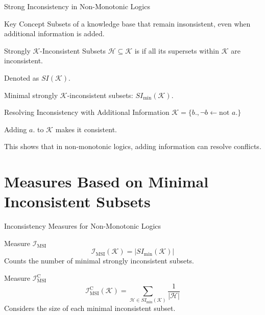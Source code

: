 \begin{frame}{Strong Inconsistency in Non-Monotonic Logics}
    \begin{block}{Key Concept}
        Subsets of a knowledge base that remain insonsistent, even when additional information is added.
    \end{block}

    \begin{block}{Strongly $\mathcal{K}$-Inconsistent Subsets}
        $\mathcal{H} \subseteq \mathcal{K}$ is  if all its supersets within $\mathcal{K}$ are inconsistent.

        Denoted as $SI(\mathcal{K})$.

        Minimal strongly $\mathcal{K}$-inconsistent subsets: $SI_{\min}(\mathcal{K})$.
    \end{block}

    \begin{exampleblock}{Resolving Inconsistency with Additional Information}
        $\mathcal{K} = \{b., \neg b \leftarrow \text{not } a.\}$

        Adding $a.$ to $\mathcal{K}$ makes it consistent.

        This shows that in non-monotonic logics, adding information can resolve conflicts.
    \end{exampleblock}
\end{frame}

\section{Measures Based on Minimal Inconsistent Subsets}

\begin{frame}{Inconsistency Measures for Non-Monotonic Logics}
    \begin{block}{Measure $\mathcal{I}_{\text{MSI}}$}
        \[
            \mathcal{I}_{\text{MSI}}(\mathcal{K}) = \left| SI_{\min}(\mathcal{K}) \right|
        \]
        Counts the number of minimal strongly inconsistent subsets.
    \end{block}
    \begin{block}{Measure $\mathcal{I}_{\text{MSI}}^\text{C}$}
        \[
            \mathcal{I}_{\text{MSI}}^\text{C}(\mathcal{K}) = \sum_{\mathcal{H} \in SI_{\min}(\mathcal{K})} \frac{1}{|\mathcal{H}|}
        \]
        Considers the size of each minimal inconsistent subset.
    \end{block}
\end{frame}

